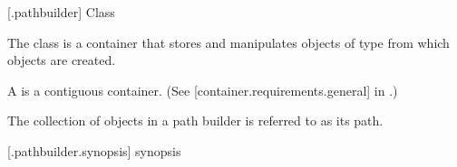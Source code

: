  [\iotwod.pathbuilder] {Class }

\pnum
{}%
The class  is a container that stores and manipulates objects of type  from which  objects are created.

\pnum
A  is a contiguous container. (See [container.requirements.general] in \CppXVII.)

\pnum
The collection of  objects in a path builder is referred to as its path.

 [\iotwod.pathbuilder.synopsis] { synopsis}%

